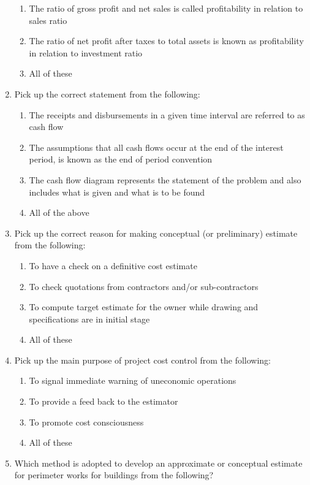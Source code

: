 \documentclass[11pt,a4paper]{article}
\begin{document}
\begin{enumerate}
\begin{enumerate}[label=\Alph*.]
\item{The ratio of gross profit and net sales is called profitability in relation to sales ratio}
\item{The ratio of net profit after taxes to total assets is known as profitability in relation to investment ratio}
\item{All of these}
\end{enumerate}
\item{Pick up the correct statement from the following:}
\begin{enumerate}[label=\Alph*.]
\item{The receipts and disbursements in a given time interval are referred to as cash flow}
\item{The assumptions that all cash flows occur at the end of the interest period, is known as the end of period convention}
\item{The cash flow diagram represents the statement of the problem and also includes what is given and what is to be found}
\item{All of the above}
\end{enumerate}
\item{Pick up the correct reason for making conceptual (or preliminary) estimate from the following:}
\begin{enumerate}[label=\Alph*.]
\item{To have a check on a definitive cost estimate}
\item{To check quotations from contractors and/or sub-contractors}
\item{To compute target estimate for the owner while drawing and specifications are in initial stage}
\item{All of these}
\end{enumerate}
\item{Pick up the main purpose of project cost control from the following:}
\begin{enumerate}[label=\Alph*.]
\item{To signal immediate warning of uneconomic operations}
\item{To provide a feed back to the estimator}
\item{To promote cost consciousness}
\item{All of these}
\end{enumerate}
\item{Which method is adopted to develop an approximate or conceptual estimate for perimeter works for buildings from the following?}
\begin{enumerate}[label=\Alph*.]

\end{enumerate}
\end{enumerate}
\end{document}
